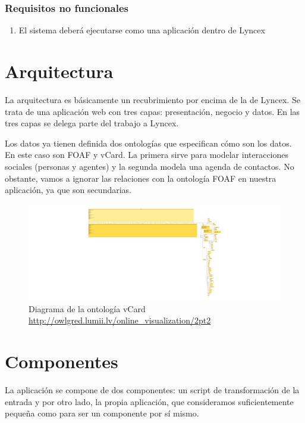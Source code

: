 \documentclass[openright,twoside,12pt]{book}
\begin{document}
\subsubsection{Requisitos no funcionales}
\begin{enumerate}
    \item El sistema deberá ejecutarse como una aplicación dentro de Lyncex
\end{enumerate}

\section{Arquitectura}

La arquitectura es básicamente un recubrimiento por encima de la de Lyncex. Se trata de una aplicación web con tres capas: presentación, negocio y datos. En las tres capas se delega parte del trabajo a Lyncex.

Los datos ya tienen definida dos ontologías que especifican cómo son los datos. En este caso son FOAF\cite{foaf} y vCard\cite{vcard}. La primera sirve para modelar interacciones sociales (personas y agentes) y la segunda modela una agenda de contactos. No obstante, vamos a ignorar las relaciones con la ontología FOAF en nuestra aplicación, ya que son secundarias.

\begin{figure}
    \centering
    \includegraphics[width=\textwidth]{vcard.png}
    \caption{Diagrama de la ontología vCard \\ \url{http://owlgred.lumii.lv/online_visualization/2pt2}}
    \label{fig:vcard}
\end{figure}

\section{Componentes}

La aplicación se compone de dos componentes: un script de transformación de la entrada y por otro lado, la propia aplicación, que consideramos suficientemente pequeña como para ser un componente por sí mismo.
\end{document}
